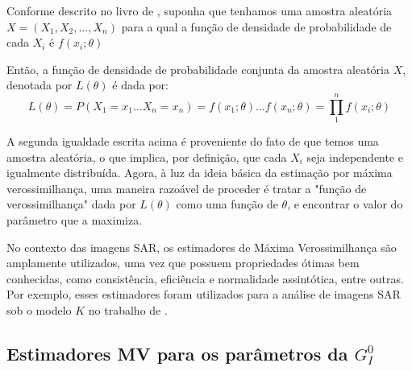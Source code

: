 Conforme descrito no livro de \citet{CasellaBergerStatisticalInference}, suponha que tenhamos uma amostra aleatória \begin{math} X = (X_{1}, X_{2}, \dots, X_{n}) \end{math} para a qual a função de densidade de probabilidade de cada \begin{math} X_{i} \end{math} é \begin{math} f(x_{i}; \theta)\end{math} 

Então, a função de densidade de probabilidade conjunta da amostra aleatória \begin{math} X \end{math}, denotada por \begin{math} L(\theta) \end{math} é dada por:
\begin{equation}
L(\theta) = P (X_{1} = x_{1} \dots X_{n} = x_{n}) =  f(x_{1}; \theta) \dots f(x_{n}; \theta) =  \prod_{1}^{n} f(x_{i}; \theta)
\end{equation}

A segunda igualdade escrita acima é proveniente do fato de que temos uma amostra aleatória, o que implica, por definição, que cada \begin{math} X_{i} \end{math} seja independente e igualmente distribuída. Agora, à luz da ideia básica da estimação por máxima verossimilhança, uma maneira razoável de proceder é tratar a "função de verossimilhança" dada por \begin{math} L (\theta) \end{math} como uma função de \begin{math} \theta \end{math}, e encontrar o valor do parâmetro que a maximiza.

No contexto das imagens SAR, os estimadores de Máxima Verossimilhança são amplamente utilizados, uma vez que possuem propriedades ótimas bem conhecidas, como consistência, eficiência e normalidade assintótica, entre outras. Por exemplo, esses estimadores foram utilizados para a análise de imagens SAR sob o modelo $K$ no trabalho de \citet{KMaxVer_Joughin}.

\subsection{Estimadores MV para os parâmetros da $G_I^0$}

